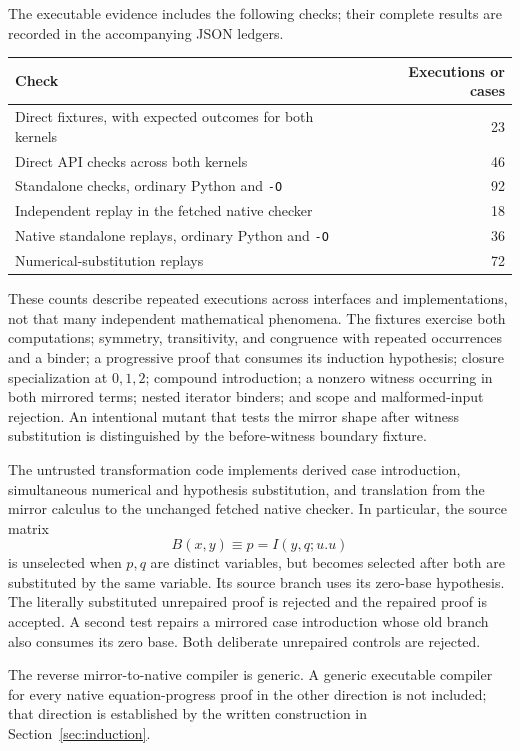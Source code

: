 The executable evidence includes the following checks; their complete
results are recorded in the accompanying JSON ledgers.
\begin{center}
\begin{tabular}{lr}
\toprule
Check & Executions or cases\\
\midrule
Direct fixtures, with expected outcomes for both kernels & 23\\
Direct API checks across both kernels & 46\\
Standalone checks, ordinary Python and \texttt{-O} & 92\\
Independent replay in the fetched native checker & 18\\
Native standalone replays, ordinary Python and \texttt{-O} & 36\\
Numerical-substitution replays & 72\\
\bottomrule
\end{tabular}
\end{center}
These counts describe repeated executions across interfaces and
implementations, not that many independent mathematical phenomena.
The fixtures exercise both computations; symmetry, transitivity, and
congruence with repeated occurrences and a binder; a progressive proof
that consumes its induction hypothesis; closure specialization at
$0,1,2$; compound introduction; a nonzero witness occurring in both
mirrored terms; nested iterator binders; and scope and malformed-input rejection.
An intentional mutant that tests the mirror shape after witness
substitution is distinguished by the before-witness boundary fixture.

The untrusted transformation code implements derived case introduction,
simultaneous numerical and hypothesis substitution, and translation
from the mirror calculus to the unchanged fetched native checker.
In particular, the source matrix
\[
 B(x,y)\equiv p=I(y,q;u.u)
\]
is unselected when $p,q$ are distinct variables, but becomes selected
after both are substituted by the same variable. Its source branch
uses its zero-base hypothesis. The literally substituted unrepaired
proof is rejected and the repaired proof is accepted. A second test
repairs a mirrored case introduction whose old branch also consumes
its zero base. Both deliberate unrepaired controls are rejected.

The reverse mirror-to-native compiler is generic. A generic executable
compiler for every native equation-progress proof in the other
direction is not included; that direction is established by the
written construction in Section~\ref{sec:induction}.

